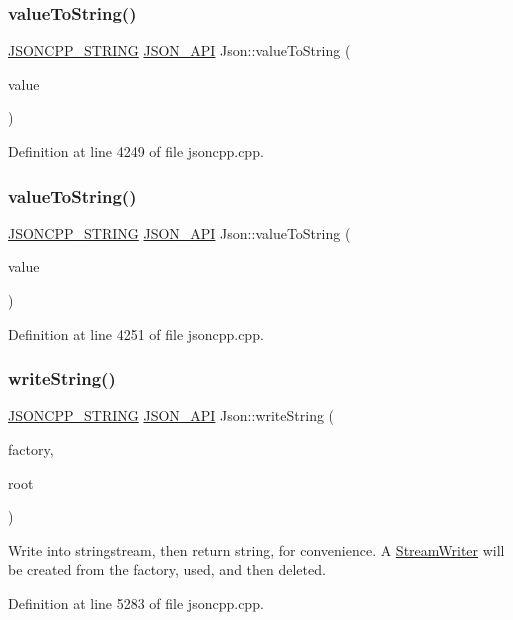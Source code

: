 \subsubsection{\texorpdfstring{value\+To\+String()}{valueToString()}\hspace{0.1cm}{\footnotesize\ttfamily [5/6]}}
{\footnotesize\ttfamily \hyperlink{config_8h_a1e723f95759de062585bc4a8fd3fa4be}{J\+S\+O\+N\+C\+P\+P\+\_\+\+S\+T\+R\+I\+NG} \hyperlink{config_8h_a1d61ffde86ce1a18fd83194ff0d9a206}{J\+S\+O\+N\+\_\+\+A\+PI} Json\+::value\+To\+String (\begin{DoxyParamCaption}\item[{double}]{value }\end{DoxyParamCaption})}



Definition at line 4249 of file jsoncpp.\+cpp.

\hypertarget{namespace_json_aed05b7acd30f7442fe36b24c7abd10b9}{}\label{namespace_json_aed05b7acd30f7442fe36b24c7abd10b9} 
\subsubsection{\texorpdfstring{value\+To\+String()}{valueToString()}\hspace{0.1cm}{\footnotesize\ttfamily [6/6]}}
{\footnotesize\ttfamily \hyperlink{config_8h_a1e723f95759de062585bc4a8fd3fa4be}{J\+S\+O\+N\+C\+P\+P\+\_\+\+S\+T\+R\+I\+NG} \hyperlink{config_8h_a1d61ffde86ce1a18fd83194ff0d9a206}{J\+S\+O\+N\+\_\+\+A\+PI} Json\+::value\+To\+String (\begin{DoxyParamCaption}\item[{bool}]{value }\end{DoxyParamCaption})}



Definition at line 4251 of file jsoncpp.\+cpp.

\hypertarget{namespace_json_aabe79c4d15b195a343b06825693b0a16}{}\label{namespace_json_aabe79c4d15b195a343b06825693b0a16} 
\subsubsection{\texorpdfstring{write\+String()}{writeString()}}
{\footnotesize\ttfamily \hyperlink{config_8h_a1e723f95759de062585bc4a8fd3fa4be}{J\+S\+O\+N\+C\+P\+P\+\_\+\+S\+T\+R\+I\+NG} \hyperlink{config_8h_a1d61ffde86ce1a18fd83194ff0d9a206}{J\+S\+O\+N\+\_\+\+A\+PI} Json\+::write\+String (\begin{DoxyParamCaption}\item[{\hyperlink{class_json_1_1_stream_writer_1_1_factory}{Stream\+Writer\+::\+Factory} const \&}]{factory,  }\item[{\hyperlink{class_json_1_1_value}{Value} const \&}]{root }\end{DoxyParamCaption})}



Write into stringstream, then return string, for convenience. A \hyperlink{class_json_1_1_stream_writer}{Stream\+Writer} will be created from the factory, used, and then deleted. 



Definition at line 5283 of file jsoncpp.\+cpp.

